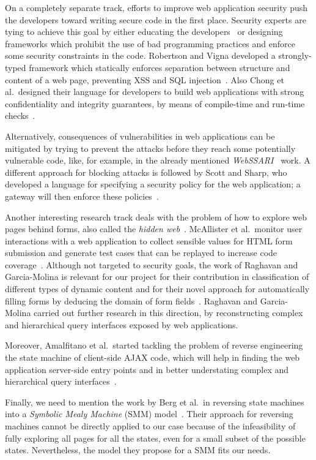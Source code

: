 On a completely separate track, efforts to improve web application security
push the developers toward writing secure code in the first place. Security
experts are tying to achieve this goal by either educating the
developers~\cite{spi02:complete} or designing frameworks which prohibit the use
of bad programming practices and enforce some security constraints in the code.
Robertson and Vigna developed a strongly-typed framework which statically
enforces separation between structure and content of a web page, preventing XSS
and SQL injection~\cite{robertson09}. Also Chong et al.\ designed their
language for developers to build web applications with strong confidentiality
and integrity guarantees, by means of compile-time and run-time checks~\cite{chong07}.

Alternatively, consequences of vulnerabilities in web applications can be
mitigated by trying to prevent the attacks before they reach some potentially
vulnerable code, like, for example, in the already mentioned
\emph{WebSSARI}~\cite{huang04:securing} work. A different approach for
blocking attacks is followed by Scott and Sharp, who developed a language for
specifying a security policy for the web application; a gateway will then
enforce these policies~\cite{scott02}.

Another interesting research track deals with the problem of how to explore web
pages behind forms, also called the \emph{hidden
  web}~\cite{raghavan01:hidden-web}. McAllister et al.\ monitor user
interactions with a web application to collect sensible values for HTML form
submission and generate test cases that can be replayed to increase code
coverage~\cite{mcallister08}. Although not targeted to security
goals, the work of Raghavan and Garcia-Molina is relevant for our project for
their contribution in classification of different types of dynamic content and
for their novel approach for automatically filling forms by deducing the domain
of form fields~\cite{raghavan01:hidden-web}. Raghavan and Garcia-Molina carried
out further research in this direction, by reconstructing complex and
hierarchical query interfaces exposed by web applications.

Moreover, Amalfitano et al.\ started tackling the problem of reverse engineering
the state machine of client-side AJAX code, which will help in finding the web
application server-side entry points and in better understating complex and
hierarchical query interfaces~\cite{amalfitano08}.

Finally, we need to mention the work by Berg et al.\ in reversing state
machines into a \emph{Symbolic Mealy Machine} (SMM)
model~\cite{berg08}. Their approach for reversing machines
cannot be directly applied to our case because of the infeasibility of fully
exploring all pages for all the states, even for a small subset of the possible
states. Nevertheless, the model they propose for a SMM fits our needs.

